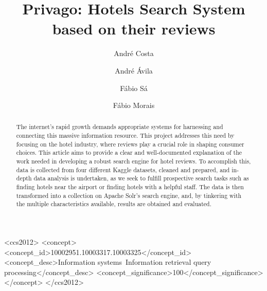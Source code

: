 \documentclass[sigconf]{acmart}
\begin{document}
\title{Privago: Hotels Search System based on their reviews}

\author{André Costa}

\author{André Ávila}

\author{Fábio Sá}

\author{Fábio Morais}


\begin{abstract}
  The internet's rapid growth demands appropriate systems for harnessing and connecting this massive information resource. This project addresses this need by focusing on the hotel industry, where reviews play a crucial role in shaping consumer choices. This article aims to provide a clear and well-documented explanation of the work needed in developing a robust search engine for hotel reviews. To accomplish this, data is collected from four different Kaggle datasets, cleaned and prepared, and in-depth data analysis is undertaken, as we seek to fulfill prospective search tasks such as finding hotels near the airport or finding hotels with a helpful staff. The data is then transformed into a collection on Apache Solr's \cite{Apache_Solr} search engine, and, by tinkering with the multiple characteristics available, results are obtained and evaluated.
\end{abstract}

\begin{CCSXML}
<ccs2012>
<concept>
<concept_id>10002951.10003317.10003325</concept_id>
<concept_desc>Information systems~Information retrieval query processing</concept_desc>
<concept_significance>100</concept_significance>
</concept>
</ccs2012>
\end{CCSXML}
\end{document}
